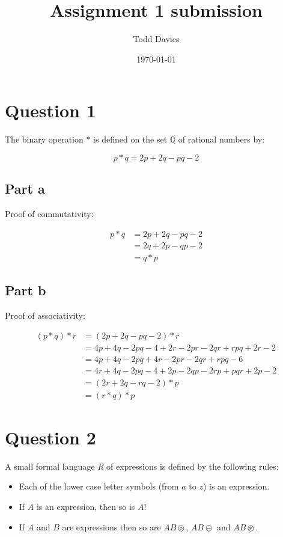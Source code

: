 \documentclass{article}
\author{Todd Davies}
\title{Assignment 1 submission}
\date{\today}
\begin{document}
\lhead{\today}

\maketitle

\section*{Question 1}

The binary operation $*$ is defined on the set $\mathbb{Q}$ of rational numbers by:

\[
    p * q = 2p + 2q - pq - 2
\]

\subsection*{Part a}

Proof of commutativity:

\[
    \begin{split}
    p * q &= 2p + 2q - pq -2\\
          &= 2q + 2p - qp - 2\\
          &= q * p
    \end{split}
\]

\subsection*{Part b}

Proof of associativity:

\[
    \begin{split}
    (p * q) * r &= (2p + 2q - pq -2) * r\\
                &= 4p + 4q - 2pq - 4 + 2r - 2pr - 2qr + rpq + 2r - 2\\
                &= 4p + 4q - 2pq + 4r - 2pr - 2qr + rpq - 6\\
                &= 4r + 4q - 2pq - 4 + 2p - 2qp - 2rp + pqr + 2p -2\\
                &= (2r + 2q - rq - 2) * p\\
                &= (r * q) * p
    \end{split}
\]

\newpage

\section*{Question 2}

A small formal language {\it R} of expressions is defined by the following rules:
\begin{itemize}

    \item Each of the lower case letter symbols (from $a$ to $z$) is an expression.
    \item If $A$ is an expression, then so is $A!$
    \item If $A$ and $B$ are expressions then so are $AB\circledcirc$, $AB\circleddash$ and $AB\circledast$.

\end{itemize}
\end{document}
